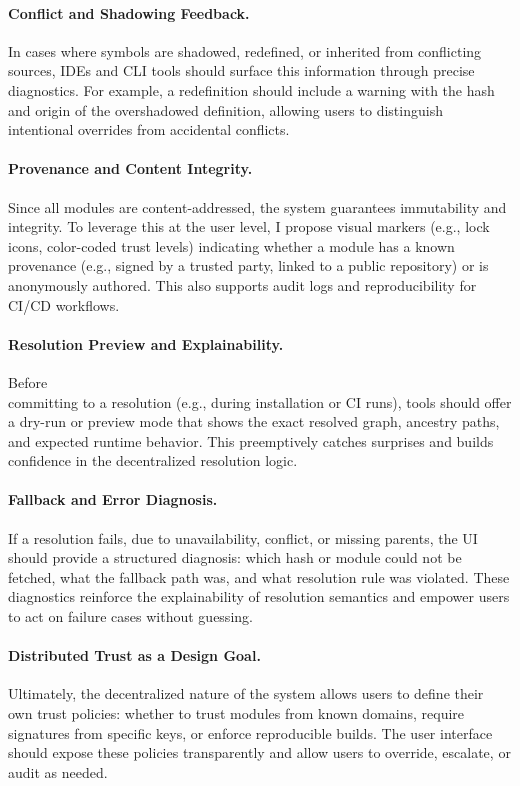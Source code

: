 \documentclass[sigplan,screen]{acmart}
\begin{document}
\paragraph{Conflict and Shadowing Feedback.}
In cases where symbols are shadowed, redefined, or inherited from conflicting sources, IDEs and CLI tools should surface this information through precise diagnostics. For example, a redefinition should include a warning with the hash and origin of the overshadowed definition, allowing users to distinguish intentional overrides from accidental conflicts.

\paragraph{Provenance and Content Integrity.}
Since all modules are content-addressed, the system guarantees immutability and integrity. To leverage this at the user level, I propose visual markers (e.g., lock icons, color-coded trust levels) indicating whether a module has a known provenance (e.g., signed by a trusted party, linked to a public repository) or is anonymously authored. This also supports audit logs and reproducibility for CI/CD workflows.

\paragraph{Resolution Preview and Explainability.}
Before \\committing to a resolution (e.g., during installation or CI runs), tools should offer a dry-run or preview mode that shows the exact resolved graph, ancestry paths, and expected runtime behavior. This preemptively catches surprises and builds confidence in the decentralized resolution logic.

\paragraph{Fallback and Error Diagnosis.}
If a resolution fails, due to unavailability, conflict, or missing parents, the UI should provide a structured diagnosis: which hash or module could not be fetched, what the fallback path was, and what resolution rule was violated. These diagnostics reinforce the explainability of resolution semantics and empower users to act on failure cases without guessing.

\paragraph{Distributed Trust as a Design Goal.}
Ultimately, the decentralized nature of the system allows users to define their own trust policies: whether to trust modules from known domains, require signatures from specific keys, or enforce reproducible builds. The user interface should expose these policies transparently and allow users to override, escalate, or audit as needed.
\end{document}
